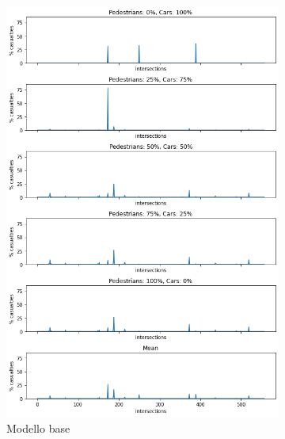 \begin{figure}[p]
    \centering
    \begin{subfigure}{0.475\textwidth}
        \centering
        \includegraphics[width=\textwidth]{images/analisi/comparison-critical-ints-base.png}
        \caption{Modello base}
        \label{fig:base-ints-casualties}
    \end{subfigure}
    \hfill
    \begin{subfigure}{0.475\textwidth}
        \centering

\end{subfigure}
\end{figure}
